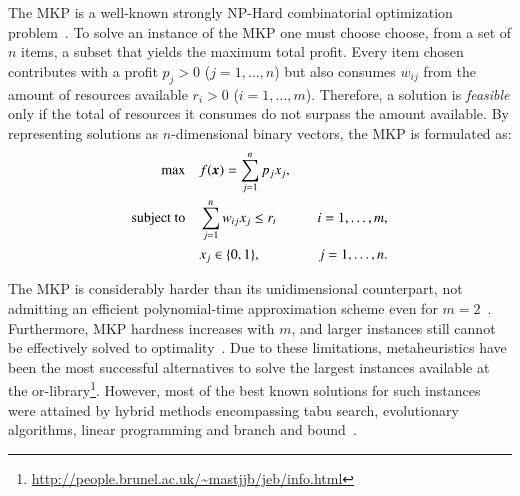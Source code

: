 \documentclass[3p,authoryear]{elsarticle}
\newcommand{\Orlib}{{\sc or-library}\xspace}
\begin{document}
The \gls{MKP} is a well-known strongly NP-Hard combinatorial optimization problem~\citep{freville2004, puchinger2010mkp}. To solve an instance of the \gls{MKP} one must choose choose, from a set of $n$ items, a subset that yields the maximum total profit. Every item chosen contributes with a profit $p_j > 0$ ($j=1,\dots,n$) but also consumes $w_{ij}$ from the amount of resources available $r_i>0$ ($i=1,\dots, m$). Therefore, a solution is \textit{feasible} only if the total of resources it consumes do not surpass the amount available. By representing solutions as $n$-dimensional binary vectors, the \gls{MKP} is formulated as:
\begin{alignat*}{3}
\max   \quad& f(\boldsymbol{x}) = \sum_{j=1}^{n} p_j x_j, &  \\
\text{subject to} \quad& \sum_{j=1}^{n} w_{ij} x_j \leq r_i &\quad i=1,\dots,m,\\
                      & x_j\in\{0,1\}, &\quad j=1,\dots,n.
\end{alignat*}


The \gls{MKP} is considerably harder than its unidimensional counterpart, not admitting an efficient polynomial-time approximation scheme even for $m=2$~\citep{Kulik2010}. Furthermore, \gls{MKP} hardness increases with $m$, and larger instances still cannot be effectively solved to optimality~\citep{mansini2012}. Due to these limitations, metaheuristics have been the most successful alternatives to solve the largest instances available at the \Orlib\footnote{\url{http://people.brunel.ac.uk/~mastjjb/jeb/info.html}}. However, most of the best known solutions for such instances were attained by hybrid methods encompassing tabu search, evolutionary algorithms, linear programming and branch and bound~\citep{puchinger2010mkp}.

\end{document}
